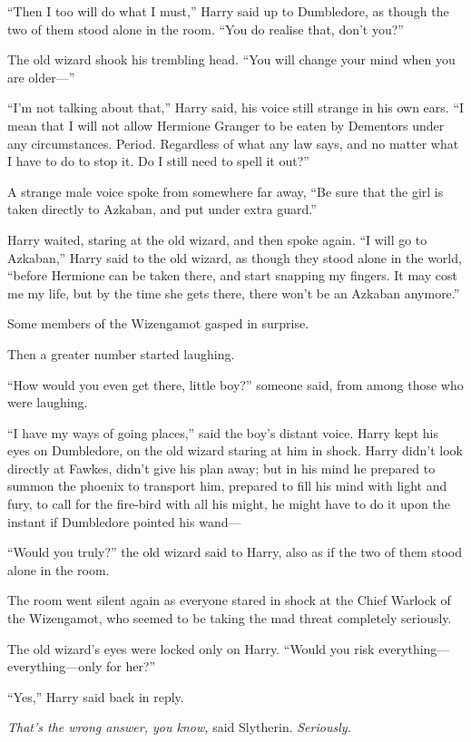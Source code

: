 ``Then I too will do what I must,'' Harry said up to Dumbledore, as
though the two of them stood alone in the room. ``You do realise that,
don't you?''

The old wizard shook his trembling head. ``You will change your mind
when you are older---''

``I'm not talking about that,'' Harry said, his voice still strange in
his own ears. ``I mean that I will not allow Hermione Granger to be
eaten by Dementors under any circumstances. Period. Regardless of what
any law says, and no matter what I have to do to stop it. Do I still
need to spell it out?''

A strange male voice spoke from somewhere far away, ``Be sure that the
girl is taken directly to Azkaban, and put under extra guard.''

Harry waited, staring at the old wizard, and then spoke again. ``I will
go to Azkaban,'' Harry said to the old wizard, as though they stood
alone in the world, ``before Hermione can be taken there, and start
snapping my fingers. It may cost me my life, but by the time she gets
there, there won't be an Azkaban anymore.''

Some members of the Wizengamot gasped in surprise.

Then a greater number started laughing.

``How would you even get there, little boy?'' someone said, from among
those who were laughing.

``I have my ways of going places,'' said the boy's distant voice. Harry
kept his eyes on Dumbledore, on the old wizard staring at him in shock.
Harry didn't look directly at Fawkes, didn't give his plan away; but in
his mind he prepared to summon the phoenix to transport him, prepared to
fill his mind with light and fury, to call for the fire-bird with all
his might, he might have to do it upon the instant if Dumbledore pointed
his wand---

``Would you truly?'' the old wizard said to Harry, also as if the two of
them stood alone in the room.

The room went silent again as everyone stared in shock at the Chief
Warlock of the Wizengamot, who seemed to be taking the mad threat
completely seriously.

The old wizard's eyes were locked only on Harry. ``Would you risk
everything---everything---only for her?''

``Yes,'' Harry said back in reply.

\emph{That's the wrong answer, you know,} said Slytherin.
\emph{Seriously.}

